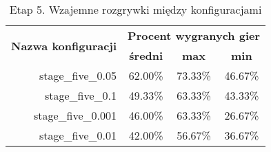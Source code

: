 \begin{longtable}[c]{|r|c|c|c|}
\caption{\label{tab:results/stage_five_all_play_all}Etap 5. Wzajemne rozgrywki między konfiguracjami} \\
\hline

\multirow{2}{*}{\textbf{Nazwa konfiguracji}} & \multicolumn{3}{|c|}{\textbf{Procent wygranych gier}} \\
\cline{2-4}
&\textbf{średni} & \textbf{max} & \textbf{min} \\
\hline
stage\_five\_0.05 & 62.00\% & 73.33\% & 46.67\% \\
\hline
stage\_five\_0.1 & 49.33\% & 63.33\% & 43.33\% \\
\hline
stage\_five\_0.001 & 46.00\% & 63.33\% & 26.67\% \\
\hline
stage\_five\_0.01 & 42.00\% & 56.67\% & 36.67\% \\
\hline
\end{longtable}
